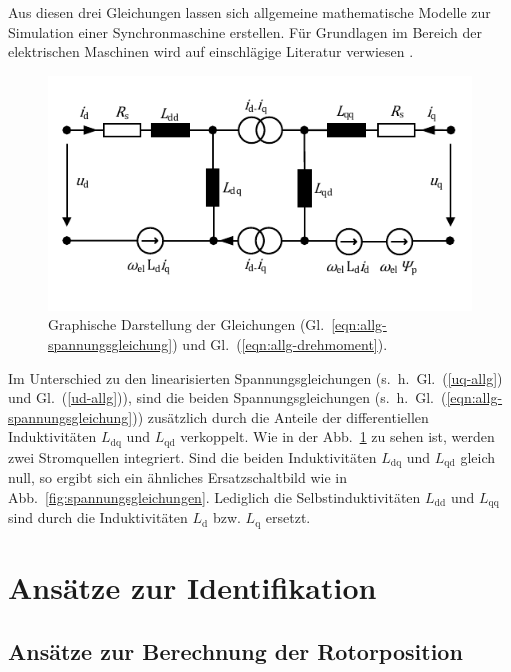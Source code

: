 \documentclass[conference,twocolumn]{IEEEtran}
\newcommand{\x}[1]{\mathrm{#1}}
\begin{document}
Aus diesen drei Gleichungen lassen sich allgemeine mathematische Modelle zur Simulation einer Synchronmaschine erstellen. 
Für Grundlagen im Bereich der elektrischen Maschinen wird auf einschlägige Literatur verwiesen \autocites{mullerII2008}{mullerI2005}{fischer2009}{schroder2001}.

\begin{figure}[!h]
\centering
\includegraphics[width=\columnwidth]{img/allg-spannungsgleichung}
\caption{Graphische Darstellung der Gleichungen (Gl.~\ref{eqn:allg-spannungsgleichung}) und Gl.~(\ref{eqn:allg-drehmoment}).}
\label{fig:allg-spannungsgleichung}
\end{figure}

Im Unterschied zu den linearisierten Spannungsgleichungen (s.~h.~Gl.~(\ref{uq-allg}) und Gl.~(\ref{ud-allg})), sind die beiden Spannungsgleichungen (s.~h.~Gl.~(\ref{eqn:allg-spannungsgleichung})) zusätzlich durch die Anteile der differentiellen Induktivitäten $L_\x{dq}$ und $L_\x{qd}$ verkoppelt.
Wie in der Abb.~\ref{fig:allg-spannungsgleichung} zu sehen ist, werden zwei Stromquellen integriert.
Sind die beiden Induktivitäten $L_\x{dq}$ und $L_\x{qd}$ gleich null, so ergibt sich ein ähnliches Ersatzschaltbild wie in Abb.~\ref{fig:spannungsgleichungen}.
Lediglich die Selbstinduktivitäten $L_\x{dd}$ und $L_\x{qq}$ sind durch die Induktivitäten $L_\x{d}$ bzw. $L_\x{q}$ ersetzt.

\section{Ansätze zur Identifikation}\label{sec:identifikation}
\subsection{Ansätze zur Berechnung der Rotorposition}\label{sec:rotorposition}
\end{document}
